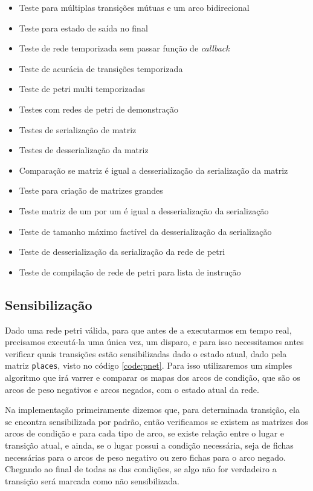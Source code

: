 \begin{itemize}
	\item Teste para múltiplas transições mútuas e um arco bidirecional
	\item Teste para estado de saída no final
	\item Teste de rede temporizada sem passar função de \textit{callback}
	\item Teste de acurácia de transições temporizada
	\item Teste de petri multi temporizadas
	\item Testes com redes de petri de demonstração
	\item Testes de serialização de matriz
	\item Testes de desserialização da matriz
	\item Comparação se matriz é igual a desserialização da serialização da matriz
	\item Teste para criação de matrizes grandes
	\item Teste matriz de um por um é igual a desserialização da serialização
	\item Teste de tamanho máximo factível da desserialização da serialização
	\item Teste de desserialização da serialização da rede de petri
	\item Teste de compilação de rede de petri para lista de instrução
\end{itemize}

\subsection{Sensibilização}

Dado uma rede petri válida, para que antes de a executarmos em tempo real, precisamos executá-la uma única vez, um disparo, e para isso necessitamos antes verificar quais transições estão sensibilizadas dado o estado atual, dado pela matriz \lstinline{places}, visto no código \ref{code:pnet}. Para isso utilizaremos um simples algoritmo que irá varrer e comparar os mapas dos arcos de condição, que são os arcos de peso negativos e arcos negados, com o estado atual da rede.



Na implementação primeiramente dizemos que, para determinada transição, ela se encontra sensibilizada por padrão, então verificamos se existem as matrizes dos arcos de condição e para cada tipo de arco, se existe relação entre o lugar e transição atual, e ainda, se o lugar possui a condição necessária, seja de fichas necessárias para o arcos de peso negativo ou zero fichas para o arco negado. Chegando ao final de todas as das condições, se algo não for verdadeiro a transição será marcada como não sensibilizada.

